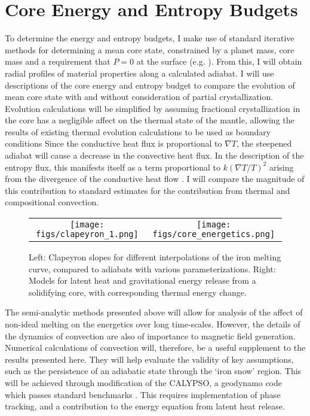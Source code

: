 \section{Core Energy and Entropy Budgets}

To determine the energy and entropy budgets, I make use of standard iterative
methods for determining a mean core state, constrained by a planet mass, core
mass and a requirement that $P=0$ at the surface (e.g. \citet{Lister1995}). From
this, I will obtain radial profiles of material properties along a calculated
adiabat.  I will use descriptions of the core energy and entropy budget
\citep{Gubbins1979,Lister1995,Lister2003} to compare the evolution of mean core state
with and without consideration of partial crystallization. Evolution
calculations will be simplified by assuming fractional crystallization in the
core has a negligible affect on the thermal state of the mantle, allowing the
results of existing thermal evolution calculations \citep{Hauck2004,Breuer2007} to
be used as boundary conditions Since the conductive heat flux is proportional
to $\nabla T$, the steepened adiabat will cause a decrease in the convective
heat flux. In the description of the entropy flux, this manifests itself as a
term proportional to $k\left(\nabla T / T \right)^2$ arising from the
divergence of the conductive heat flow \citep{Lister2003}. I will compare the
magnitude of this contribution to standard estimates for the contribution from
thermal and compositional convection.


 \begin{figure}[h] %
   \centering
\begin{tabular}{cc}
 \texttt{[image: figs/clapeyron\_1.png]} &
 \texttt{[image: figs/core\_energetics.png]} \\
\end{tabular}
\caption{Left: Clapeyron slopes for different interpolations of the iron
melting curve, compared to adiabats with various parameterizations.  Right:  Models
for latent heat and gravitational energy release from a solidifying core, with
corresponding thermal energy change.}
\label{fig:core_energy}
\end{figure}

The semi-analytic methods presented above will allow for analysis of the
affect of non-ideal melting on the energetics over long time-scales. However,
the details of the dynamics of convection are also of importance to magnetic field
generation. Numerical calculations of convection will, therefore, be a useful
supplement to the results presented here. They will help evaluate the validity of
key assumptions, such as the persistence of an adiabatic state through the
`iron snow' region. This will be achieved through modification of the CALYPSO,
a geodynamo code which passes standard benchmarks \citep{Christensen2001}. This
requires implementation of phase tracking, and a contribution to the energy
equation from latent heat release. 



